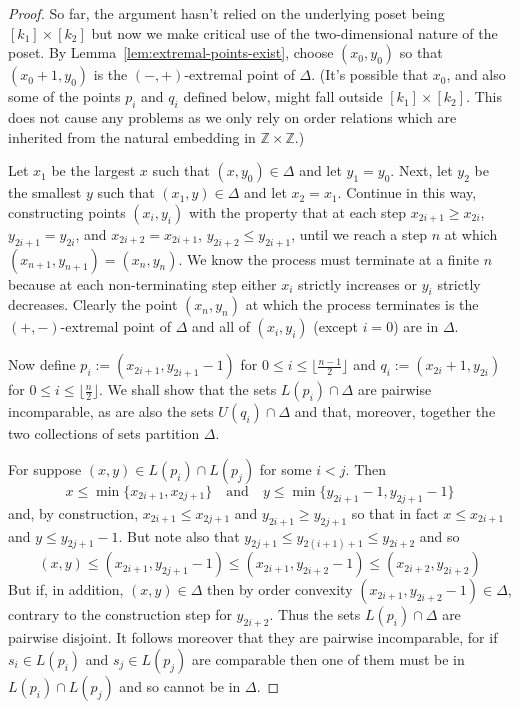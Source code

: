 \documentclass[10pt, a4paper]{article}
\theoremstyle{plain}
\theoremstyle{definition}
\newcommand{\ZZ}{\mathbb{Z}}
\begin{document}
\begin{proof}
  So far, the argument hasn't relied on the underlying poset being $[k_1]\times[k_2]$
  but now we make critical use of the two-dimensional nature of the poset. By
  Lemma~\ref{lem:extremal-points-exist}, choose $(x_0, y_0)$ so that $(x_0+1, y_0)$ is
  the $(-, +)$-extremal point of $\Delta$. (It's possible that $x_0$, and also some of the points
  $p_i$ and $q_i$ defined below, might fall outside $[k_1]\times[k_2]$. This does not
  cause any problems as we only rely on order relations which are inherited from the natural
  embedding in $\ZZ\times\ZZ$.)

  Let $x_1$ be the largest $x$ such that $(x, y_0)\in\Delta$ and let $y_1=y_0$.
  Next, let $y_2$ be the smallest $y$ such that $(x_1, y)\in\Delta$ and let $x_2 = x_1$.
  Continue in this way, constructing points $(x_i, y_i)$ with the property that
  at each step $x_{2i+1} \ge x_{2i}$, $y_{2i+1} = y_{2i}$, and
  $x_{2i+2} = x_{2i+1}$, $y_{2i+2} \le y_{2i+1}$, until we reach a step $n$ at which
  $(x_{n+1}, y_{n+1}) = (x_n, y_n)$. We know the process must terminate at a finite
  $n$ because at each non-terminating step either $x_i$ strictly increases or $y_i$ strictly decreases.
  Clearly the point $(x_n, y_n)$ at which the process terminates is the $(+, -)$-extremal
  point of $\Delta$ and all of $(x_i, y_i)$ (except $i=0$) are in $\Delta$.

  Now define $p_i := (x_{2i+1}, y_{2i+1} - 1)$ for $0\le i\le \lfloor\frac{n-1}{2}\rfloor$
  and $q_i := (x_{2i}+1, y_{2i})$ for $0\le i\le \lfloor \frac{n}{2}\rfloor$.
  We shall show that the sets $L(p_i)\cap\Delta$ are pairwise incomparable, as are
  also the sets $U(q_i)\cap\Delta$ and that, moreover, together the two collections
  of sets partition $\Delta$.

  For suppose
  $(x,y)\in L({p_i})\cap L(p_j)$ for some $i<j$. Then
  \[
    x \le \min\{x_{2i+1}, x_{2j+1}\} \quad\text{and}\quad y \le \min\{y_{2i+1}-1, y_{2j+1}-1\}
  \]
  and, by construction, $x_{2i+1}\le x_{2j+1}$ and $y_{2i+1}\ge y_{2j+1}$ so that in fact
  $x\le x_{2i+1}$ and $y\le y_{2j+1}-1$. But note also that
  $y_{2j+1}\le y_{2(i+1)+1}\le y_{2i+2}$ and so
  \[
    (x,y) \le (x_{2i+1}, y_{2j+1} - 1) \le (x_{2i+1}, y_{2i+2} - 1) \le (x_{2i+2}, y_{2i+2})
  \]
  But if, in addition,  $(x,y)\in\Delta$ then by order convexity $(x_{2i+1}, y_{2i+2} - 1)\in\Delta$,
  contrary to the construction step for $y_{2i+2}$. Thus the sets $L(p_i)\cap \Delta$
  are pairwise disjoint. It follows moreover that they are pairwise incomparable,
  for if $s_i\in L(p_i)$ and $s_j\in L(p_j)$ are comparable then one of them must be
  in $L(p_i)\cap L(p_j)$ and so cannot be in $\Delta$.


\end{proof}
\end{document}
